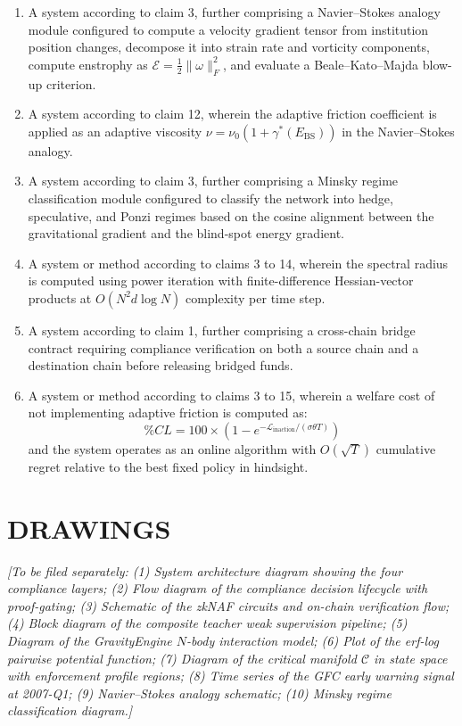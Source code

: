 \documentclass[12pt,a4paper]{article}
\begin{document}
\begin{enumerate}[label=\textbf{\arabic*.}]
\item A system according to claim 3, further comprising a Navier--Stokes
analogy module configured to compute a velocity gradient tensor from
institution position changes, decompose it into strain rate and vorticity
components, compute enstrophy as $\mathcal{E}=\frac{1}{2}\|\omega\|_F^2$,
and evaluate a Beale--Kato--Majda blow-up criterion.

\item A system according to claim 12, wherein the adaptive friction
coefficient is applied as an adaptive viscosity
$\nu=\nu_0(1+\gamma^*(E_{\mathrm{BS}}))$ in the Navier--Stokes analogy.

\item A system according to claim 3, further comprising a Minsky regime
classification module configured to classify the network into hedge,
speculative, and Ponzi regimes based on the cosine alignment between the
gravitational gradient and the blind-spot energy gradient.

\item A system or method according to claims 3 to 14, wherein the
spectral radius is computed using power iteration with finite-difference
Hessian-vector products at $O(N^2 d\log N)$ complexity per time step.

\item A system according to claim 1, further comprising a cross-chain
bridge contract requiring compliance verification on both a source chain
and a destination chain before releasing bridged funds.

\item A system or method according to claims 3 to 15, wherein a welfare
cost of not implementing adaptive friction is computed as:
\[
\%CL = 100\times\!\left(1-e^{-\mathcal{L}_{\mathrm{inaction}}/
(\sigma\theta T)}\right)
\]
and the system operates as an online algorithm with $O(\sqrt{T})$
cumulative regret relative to the best fixed policy in hindsight.

\end{enumerate}

\section{DRAWINGS}

\textit{[To be filed separately:
(1) System architecture diagram showing the four compliance layers;
(2) Flow diagram of the compliance decision lifecycle with proof-gating;
(3) Schematic of the zkNAF circuits and on-chain verification flow;
(4) Block diagram of the composite teacher weak supervision pipeline;
(5) Diagram of the GravityEngine $N$-body interaction model;
(6) Plot of the erf-log pairwise potential function;
(7) Diagram of the critical manifold $\mathcal{C}$ in state space with
enforcement profile regions;
(8) Time series of the GFC early warning signal at 2007-Q1;
(9) Navier--Stokes analogy schematic;
(10) Minsky regime classification diagram.]}
\end{document}
